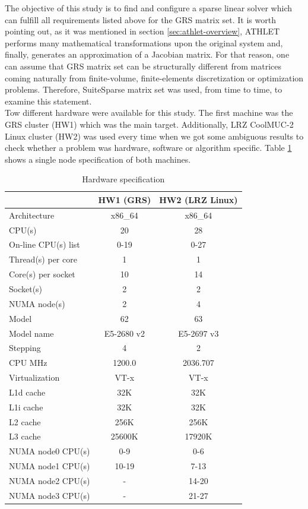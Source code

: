 The objective of this study is to find and configure a sparse linear solver which can fulfill all requirements listed above for the GRS matrix set. It is worth pointing out, as it was mentioned in section \ref{sec:athlet-overview}, ATHLET performs many mathematical transformations upon the original system and, finally, generates an approximation of a Jacobian matrix. For that reason, one can assume that GRS matrix set can be structurally different from matrices coming naturally from finite-volume, finite-elements discretization or optimization problems. Therefore, SuiteSparse matrix set was used, from time to time, to examine this statement.\\


Tow different hardware were available for this study. The first machine was the GRS cluster (HW1) which was the main target. Additionally, LRZ CoolMUC-2 Linux cluster (HW2) was used every time when we got some ambiguous results to check whether a problem was hardware, software or algorithm specific. Table \ref{table:hardware-spec} shows a single node specification of both machines.\\


\begin{table}[ht]
\centering
\small
\begin{tabular}{|l|c|c|}
\hline
                    & HW1 (GRS) & HW2 (LRZ Linux) \\ \hline
Architecture        & x86\_64 & x86\_64 \\ \hline
CPU(s)              & 20 &  28 \\ \hline
On-line CPU(s) list & 0-19 &  0-27 \\ \hline
Thread(s) per core  & 1 &  1 \\  \hline
Core(s) per socket  & 10 & 14 \\ \hline
Socket(s)           & 2 &  2 \\ \hline
NUMA node(s)        & 2 &  4 \\ \hline
Model               & 62 &  63 \\ \hline
Model name          & E5-2680 v2 & 
E5-2697 v3 \\ \hline
Stepping            & 4 &  2 \\ \hline
CPU MHz             & 1200.0 &  2036.707 \\ \hline
Virtualization      & VT-x &  VT-x \\ \hline
L1d cache           & 32K &  32K \\ \hline
L1i cache           & 32K &  32K \\ \hline
L2 cache            & 256K &  256K \\ \hline
L3 cache            & 25600K &  17920K \\ \hline
NUMA node0 CPU(s)   & 0-9 &  0-6 \\ \hline
NUMA node1 CPU(s)   & 10-19 &  7-13 \\ \hline
NUMA node2 CPU(s)   & - &  14-20 \\ \hline
NUMA node3 CPU(s)   & - &  21-27 \\ \hline
\end{tabular}
\caption{Hardware specification}
\label{table:hardware-spec}
\end{table}



